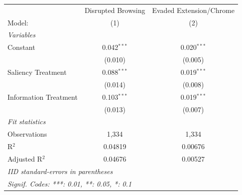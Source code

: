 
\begingroup
\centering
\begin{tabular}{lcc}
   \tabularnewline \midrule \midrule
                         & Disrupted Browsing & Evaded Extension/Chrome \\   
   Model:                & (1)                & (2)\\  
   \midrule
   \emph{Variables}\\
   Constant              & 0.042$^{***}$      & 0.020$^{***}$\\   
                         & (0.010)            & (0.005)\\   
   Saliency Treatment    & 0.088$^{***}$      & 0.019$^{***}$\\   
                         & (0.014)            & (0.008)\\   
   Information Treatment & 0.103$^{***}$      & 0.019$^{***}$\\   
                         & (0.013)            & (0.007)\\   
   \midrule
   \emph{Fit statistics}\\
   Observations          & 1,334              & 1,334\\  
   R$^2$                 & 0.04819            & 0.00676\\  
   Adjusted R$^2$        & 0.04676            & 0.00527\\  
   \midrule \midrule
   \multicolumn{3}{l}{\emph{IID standard-errors in parentheses}}\\
   \multicolumn{3}{l}{\emph{Signif. Codes: ***: 0.01, **: 0.05, *: 0.1}}\\
\end{tabular}
\par\endgroup


